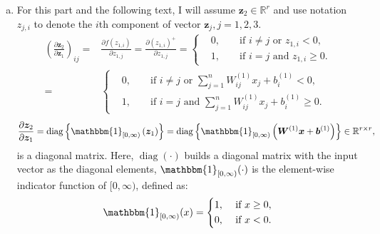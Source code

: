 \documentclass[10pt,a4paper]{article}
\theoremstyle{dotlessP}
\def\RR{\mathbb{R}}
\DeclareRobustCommand{\diag}{\operatorname*{diag}}
\newcommand{\dldy}{\frac{\partial l}{\partial \bm{\hat{y}}}}
\newcommand{\dydz}{\frac{\partial \bm{\hat{y}}}{\partial \bm z_3}}
\newcommand{\dzdz}{\frac{\partial \bm z_2}{\partial \bm z_1}}
\begin{document}
\begin{enumerate}[(a)]
\item For this part and the following text, I will assume $\bm z_2\in \RR^r$ and use notation $z_{j,i}$ to denote the $i$th component of vector $\bm z_j, j=1,2,3.$
\begin{equation}
\begin{aligned}
\left(\dzdz\right)_{ij} =&\frac{\partial f( z_{1,i})}{\partial z_{1,j}} = \frac{\partial ( z_{1,i})^+}{\partial z_{1,j}}
=\left\lbrace 
\begin{aligned}
&0, & &\text{ if } i\neq j \text{ or }   z_{1,i} <0,\\
& 1, &  &\text{ if } i= j \text{ and }   z_{1,i} \geq 0.
\end{aligned}
 \right. 
\\
=&\left\lbrace 
\begin{aligned}
&0, & &\text{ if } i\neq j \text{ or }   \sum_{j=1}^{n} W^{(1)}_{ij} x_j +b^{(1)}_i<0,\\
& 1, &  &\text{ if } i= j \text{ and }   \sum_{j=1}^{n} W^{(1)}_{ij} x_j +b^{(1)}_i \geq 0.
\end{aligned}
\right. 
\end{aligned}
\end{equation}
\begin{equation}
\dzdz =\diag\left\lbrace \mathbbm{1}_{[0,\infty)}\left(\bm z_1 \right)\right\rbrace =\diag\left\lbrace \mathbbm{1}_{[0,\infty)}\left(\bm W^{(1)} \bm x+\bm b^{(1)}\right)\right\rbrace \in \RR^{r\times r},
\end{equation}
is a diagonal matrix. Here, $\diag(\cdot)$ builds a diagonal matrix with the input vector as the diagonal elements, $\mathbbm{1}_{[0,\infty)}(\cdot)$ is the element-wise indicator function of $[0,\infty)$, defined as:
\begin{equation}
\mathbbm{1}_{[0,\infty)}(x)=\left\lbrace 
\begin{aligned}
&1, & &\text{ if } x\geq 0,\\
& 0, &  &\text{ if } x< 0.
\end{aligned}
\right. 
\end{equation}


\end{enumerate}
\end{document}
